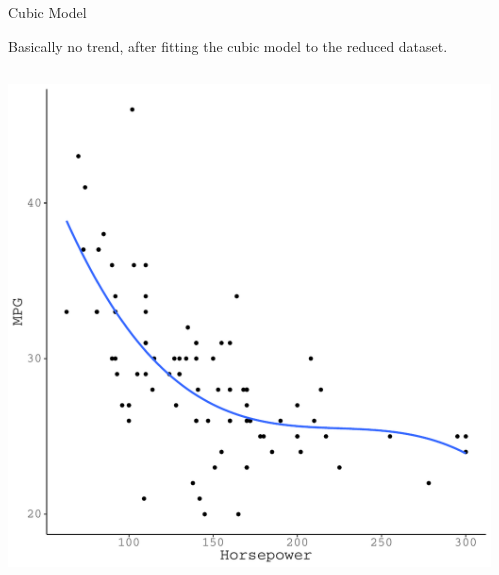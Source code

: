 \documentclass{beamer}\usepackage[]{graphicx}\usepackage[]{color}
\makeatletter
\def\maxwidth{ %
  \ifdim\Gin@nat@width>\linewidth
    \linewidth
  \else
    \Gin@nat@width
  \fi
}
\newenvironment{knitrout}{}{} %
\makeatother
\begin{document}
\begin{frame}{Cubic Model}

  Basically no trend, after fitting the cubic model to the reduced dataset.
  \vb
  \begin{columns}
    \begin{column}{0.5\textwidth}
      
\begin{knitrout}\footnotesize
{}\color{fgcolor}

{\centering \includegraphics[width=\maxwidth]{figure/unnamed-chunk-47-1} 

}



\end{knitrout}

\end{column}

\begin{column}{0.5\textwidth}
  
\begin{knitrout}\footnotesize
{}\color{fgcolor}


\end{knitrout}
\end{column}
\end{columns}
\end{frame}
\end{document}
